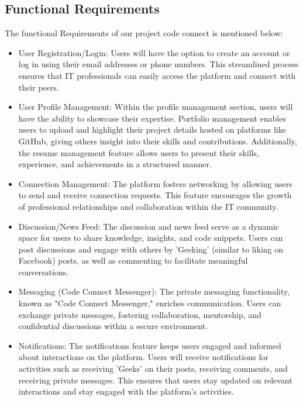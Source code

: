 \subsection{Functional Requirements}
The functional Requirements of our project code connect is mentioned below:
\begin{itemize}
    \item User Registration/Login:
      Users will have the option to create an account or log in using their email addresses or phone numbers. This streamlined process ensures that IT professionals can easily access the platform and connect with their peers.
    \item User Profile Management:
      Within the profile management section, users will have the ability to showcase their expertise. Portfolio management enables users to upload and highlight their project details hosted on platforms like GitHub, giving others insight into their skills and contributions. Additionally, the resume management feature allows users to present their skills, experience, and achievements in a structured manner.
    \item Connection Management:
      The platform fosters networking by allowing users to send and receive connection requests. This feature encourages the growth of professional relationships and collaboration within the IT community.
    \item Discussion/News Feed:
      The discussion and news feed serve as a dynamic space for users to share knowledge, insights, and code snippets. Users can post discussions and engage with others by 'Geeking' (similar to liking on Facebook) posts, as well as commenting to facilitate meaningful conversations.
    \item Messaging (Code Connect Messenger):
      The private messaging functionality, known as "Code Connect Messenger," enriches communication. Users can exchange private messages, fostering collaboration, mentorship, and confidential discussions within a secure environment.
    \item Notifications:
      The notifications feature keeps users engaged and informed about interactions on the platform. Users will receive notifications for activities such as receiving 'Geeks' on their posts, receiving comments, and receiving private messages. This ensures that users stay updated on relevant interactions and stay engaged with the platform's activities.
    
  \end{itemize}
